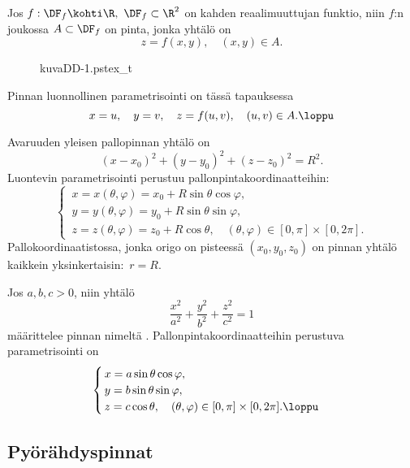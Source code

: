 \begin{Exa} Jos $f: \DF_f \kohti \R,\ \DF_f \subset \R^2$ on kahden reaalimuuttujan funktio,
niin $f$:n  joukossa $A\subset\DF_f$ on pinta, jonka yhtälö on
\[
z=f(x,y),\quad (x,y)\in A.
\]
\begin{figure}[H]
\begin{center}
{kuvaDD-1.pstex_t}
\end{center}
\end{figure}
Pinnan luonnollinen parametrisointi on tässä tapauksessa
\[
x=u,\quad y=v,\quad z=f(u,v), \quad (u,v) \in A. \loppu 
 \]
\end{Exa}
\begin{Exa} Avaruuden yleisen pallopinnan yhtälö on
\[ 
(x-x_0)^2 + (y-y_0)^2 + (z-z_0)^2 = R^2. 
\]
Luontevin parametrisointi perustuu pallonpintakoordinaatteihin:
\[ \begin{cases} \,x = x(\theta,\varphi) = x_0 + R \sin \theta \cos \varphi, \\
                 \,y = y(\theta,\varphi) = y_0 + R \sin \theta \sin \varphi, \\
                 \,z = z(\theta,\varphi) 
                   = z_0 + R \cos \theta, \quad (\theta,\varphi) \in [0,\pi] \times [0,2\pi].
   \end{cases} \]
Pallokoordinaatistossa, jonka origo on pisteessä $(x_0,y_0,z_0)$ on pinnan yhtälö kaikkein 
yksinkertaisin: $\,r = R$. \loppu \end{Exa}
\begin{Exa} Jos $a,b,c>0$, niin yhtälö
\[ 
\frac{x^2}{a^2} + \frac{y^2}{b^2} + \frac{z^2}{c^2} = 1 
\]
määrittelee pinnan nimeltä
%
. Pallonpintakoordinaatteihin perustuva parametrisointi on
\[ \begin{cases} 
     \,x = a \sin \theta \cos \varphi, \\ 
     \,y = b \sin \theta \sin \varphi, \\ 
     \,z = c \cos \theta, \quad (\theta,\varphi) \in [0,\pi] \times [0,2\pi]. \loppu
   \end{cases} \]
\end{Exa}

\subsection{Pyörähdyspinnat}

